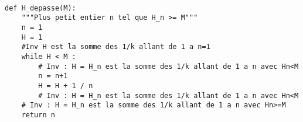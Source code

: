 \exer{}
\setcounter{numques}{0}

\question{}
\begin{lstlisting}

def H_depasse(M):
    """Plus petit entier n tel que H_n >= M"""
    n = 1
    H = 1
    #Inv H est la somme des 1/k allant de 1 a n=1
    while H < M : 
        # Inv : H = H_n est la somme des 1/k allant de 1 a n avec Hn<M
        n = n+1
        H = H + 1 / n
        # Inv : H = H_n est la somme des 1/k allant de 1 a n avec Hn<M
    # Inv : H = H_n est la somme des 1/k allant de 1 a n avec Hn>=M
    return n
\end{lstlisting}

